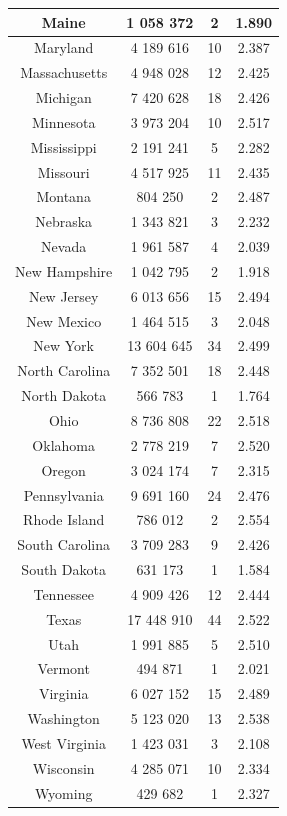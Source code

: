 \documentclass[a4paper,10pt,calibri,oneside,openany, twocolumn]{report}
\theoremstyle{break}
\begin{document}
\begin{table}
\begin{tabular}{|c|c|c|c|}
	\hline
	Maine &1 058 372&2&1.890\\
	\hline
	Maryland &4 189 616&10&2.387\\
	\hline
	Massachusetts &4 948 028&12&2.425\\
	\hline
	Michigan &7 420 628&18&2.426\\
	\hline
	Minnesota &3 973 204&10&2.517\\
	\hline
	Mississippi &2 191 241&5&2.282\\
	\hline
	Missouri &4 517 925&11&2.435\\
	\hline
	Montana &804 250&2&2.487\\
	\hline
	Nebraska &1 343 821&3&2.232\\
	\hline
	Nevada &1 961 587&4&2.039\\
	\hline
	New Hampshire &1 042 795&2&1.918\\
	\hline
	New Jersey &6 013 656&15&2.494\\
	\hline
	New Mexico &1 464 515&3&2.048\\
	\hline
	New York &13 604 645&34&2.499\\
	\hline
	North Carolina &7 352 501&18&2.448\\
	\hline
	North Dakota &566 783&1&1.764\\
	\hline
	Ohio &8 736 808&22&2.518\\
	\hline
	Oklahoma &2 778 219&7&2.520\\
	\hline
	Oregon &3 024 174&7&2.315\\
	\hline
	Pennsylvania &9 691 160&24&2.476\\
	\hline
	Rhode Island &786 012&2&2.554\\
	\hline
	South Carolina &3 709 283&9&2.426\\
	\hline
	South Dakota &631 173&1&1.584\\
	\hline
	Tennessee &4 909 426&12&2.444\\
	\hline
	Texas &17 448 910&44&2.522\\
	\hline
	Utah &1 991 885&5&2.510\\
	\hline
	Vermont &494 871&1&2.021\\
	\hline
	Virginia &6 027 152&15&2.489\\
	\hline
	Washington &5 123 020&13&2.538\\
	\hline
	West Virginia &1 423 031&3&2.108\\
	\hline
	Wisconsin &4 285 071&10&2.334\\
	\hline
	Wyoming &429 682&1&2.327\\
	\hline
	\end{tabular}
\end{table}
\end{document}
